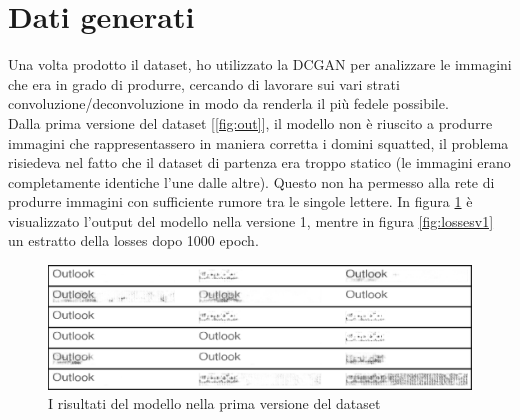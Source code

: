 \section{Dati generati}
Una volta prodotto il dataset, ho utilizzato la DCGAN per analizzare le immagini che era in grado di produrre, cercando di lavorare sui vari strati convoluzione/deconvoluzione in modo da renderla il più fedele possibile.\\
Dalla prima versione del dataset [\ref{fig:out}], il modello non è riuscito a produrre immagini che rappresentassero in maniera corretta i domini squatted, il problema risiedeva nel fatto che il dataset di partenza era troppo statico (le immagini erano completamente identiche l'une dalle altre). Questo non ha permesso alla rete di produrre immagini con sufficiente rumore tra le singole lettere. In figura \ref{fig:v1} è visualizzato l'output del modello nella versione 1, mentre in figura \ref{fig:lossesv1} un estratto della losses dopo 1000 epoch.
\begin{figure}[!h]
  \centering
  \begin{minipage}[b]{\textwidth}
    \includegraphics[width=\textwidth]{pictures/picsv1.png}
    \caption{I risultati del modello nella prima versione del dataset}
    \label{fig:v1}
  \end{minipage}
  \hfill
\end{figure}

